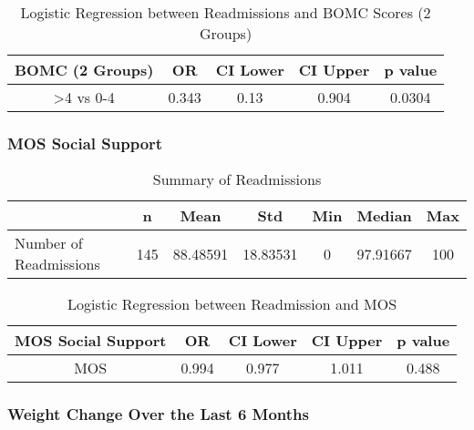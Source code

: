 \documentclass[12pt,]{article}
\begin{document}
\pagebreak

\begin{table}[!h]

\caption{\label{tab:unnamed-chunk-27}Logistic Regression between Readmissions and BOMC Scores (2 Groups)}
\centering
\begin{tabular}{ccccc}
\toprule
BOMC (2 Groups) & OR & CI Lower & CI Upper & p value\\
\midrule
\rowcolor{white}  >4 vs 0-4 & 0.343 & 0.13 & 0.904 & 0.0304\\
\bottomrule
\end{tabular}
\end{table}

\pagebreak

\subsubsection{MOS Social Support}\label{mos-social-support}

\begin{table}[!h]

\caption{\label{tab:unnamed-chunk-28}Summary of Readmissions}
\centering
\begin{tabular}{>{\raggedright\arraybackslash}p{5cm}cccccc}
\toprule
  & n & Mean & Std & Min & Median & Max\\
\midrule
\rowcolor{white}  Number of Readmissions & 145 & 88.48591 & 18.83531 & 0 & 97.91667 & 100\\
\bottomrule
\end{tabular}
\end{table}

\begin{table}[!h]

\caption{\label{tab:unnamed-chunk-28}Logistic Regression between Readmission and MOS}
\centering
\begin{tabular}{ccccc}
\toprule
MOS Social Support & OR & CI Lower & CI Upper & p value\\
\midrule
\rowcolor{white}  MOS & 0.994 & 0.977 & 1.011 & 0.488\\
\bottomrule
\end{tabular}
\end{table}

\pagebreak

\subsubsection{Weight Change Over the Last 6
Months}\label{weight-change-over-the-last-6-months}
\end{document}
